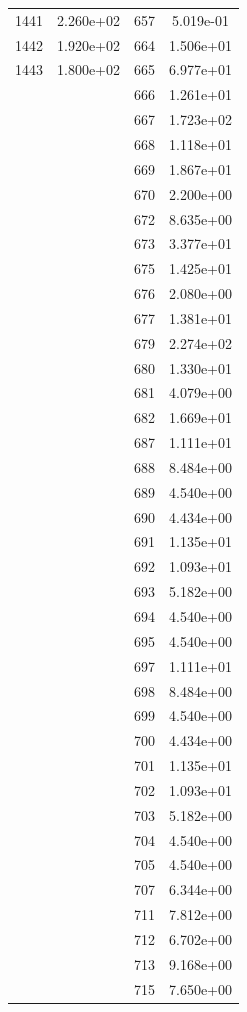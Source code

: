 \documentclass[12pt]{article}
\begin{document}
\begin{longtable}{@{}cccc@{}}
1441 & 2.260e+02 & 657 & 5.019e-01 \\
1442 & 1.920e+02 & 664 & 1.506e+01 \\
1443 & 1.800e+02 & 665 & 6.977e+01 \\
 &  & 666 & 1.261e+01 \\
 &  & 667 & 1.723e+02 \\
 &  & 668 & 1.118e+01 \\
 &  & 669 & 1.867e+01 \\
 &  & 670 & 2.200e+00 \\
 &  & 672 & 8.635e+00 \\
 &  & 673 & 3.377e+01 \\
 &  & 675 & 1.425e+01 \\
 &  & 676 & 2.080e+00 \\
 &  & 677 & 1.381e+01 \\
 &  & 679 & 2.274e+02 \\
 &  & 680 & 1.330e+01 \\
 &  & 681 & 4.079e+00 \\
 &  & 682 & 1.669e+01 \\
 &  & 687 & 1.111e+01 \\
 &  & 688 & 8.484e+00 \\
 &  & 689 & 4.540e+00 \\
 &  & 690 & 4.434e+00 \\
 &  & 691 & 1.135e+01 \\
 &  & 692 & 1.093e+01 \\
 &  & 693 & 5.182e+00 \\
 &  & 694 & 4.540e+00 \\
 &  & 695 & 4.540e+00 \\
 &  & 697 & 1.111e+01 \\
 &  & 698 & 8.484e+00 \\
 &  & 699 & 4.540e+00 \\
 &  & 700 & 4.434e+00 \\
 &  & 701 & 1.135e+01 \\
 &  & 702 & 1.093e+01 \\
 &  & 703 & 5.182e+00 \\
 &  & 704 & 4.540e+00 \\
 &  & 705 & 4.540e+00 \\
 &  & 707 & 6.344e+00 \\
 &  & 711 & 7.812e+00 \\
 &  & 712 & 6.702e+00 \\
 &  & 713 & 9.168e+00 \\
 &  & 715 & 7.650e+00 \\

\end{longtable}
\end{document}
